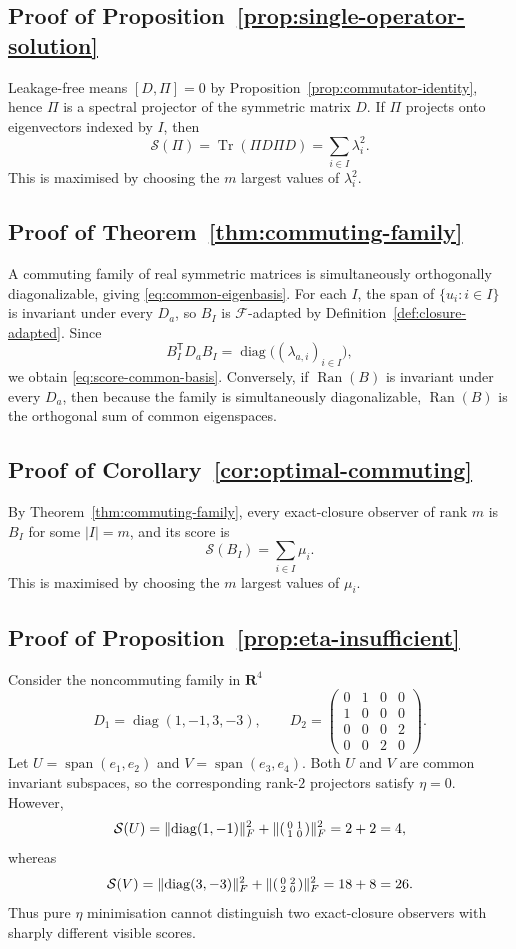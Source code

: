 \documentclass[11pt,a4paper]{article}
\numberwithin{equation}{section}
\DeclareMathOperator{\Tr}{Tr}
\DeclareMathOperator{\Ran}{Ran}
\DeclareMathOperator{\diag}{diag}
\DeclareMathOperator{\spanop}{span}
\DeclarePairedDelimiter{\norm}{\lVert}{\rVert}
\newcommand{\R}{\mathbf R}
\theoremstyle{thmcompact}
\theoremstyle{remark}
\begin{document}
\subsection*{Proof of Proposition~\ref{prop:single-operator-solution}}
Leakage-free means $[D,\Pi]=0$ by Proposition~\ref{prop:commutator-identity}, hence $\Pi$ is a spectral projector of the symmetric matrix $D$. If $\Pi$ projects onto eigenvectors indexed by $I$, then
\[
\mathcal S(\Pi)=\Tr(\Pi D\Pi D)=\sum_{i\in I}\lambda_i^2.
\]
This is maximised by choosing the $m$ largest values of $\lambda_i^2$.

\subsection*{Proof of Theorem~\ref{thm:commuting-family}}
A commuting family of real symmetric matrices is simultaneously orthogonally diagonalizable, giving \eqref{eq:common-eigenbasis}. For each $I$, the span of $\{u_i:i\in I\}$ is invariant under every $D_a$, so $B_I$ is $\mathcal F$-adapted by Definition~\ref{def:closure-adapted}. Since
\[
B_I^{\mathsf T}D_aB_I=\diag\bigl((\lambda_{a,i})_{i\in I}\bigr),
\]
we obtain \eqref{eq:score-common-basis}. Conversely, if $\Ran(B)$ is invariant under every $D_a$, then because the family is simultaneously diagonalizable, $\Ran(B)$ is the orthogonal sum of common eigenspaces.

\subsection*{Proof of Corollary~\ref{cor:optimal-commuting}}
By Theorem~\ref{thm:commuting-family}, every exact-closure observer of rank $m$ is $B_I$ for some $|I|=m$, and its score is
\[
\mathcal S(B_I)=\sum_{i\in I}\mu_i.
\]
This is maximised by choosing the $m$ largest values of $\mu_i$.

\subsection*{Proof of Proposition~\ref{prop:eta-insufficient}}
Consider the noncommuting family in $\R^4$
\[
D_1=\diag(1,-1,3,-3),
\qquad
D_2=
\begin{pmatrix}
0&1&0&0\\
1&0&0&0\\
0&0&0&2\\
0&0&2&0
\end{pmatrix}.
\]
Let $U=\spanop(e_1,e_2)$ and $V=\spanop(e_3,e_4)$. Both $U$ and $V$ are common invariant subspaces, so the corresponding rank-$2$ projectors satisfy $\eta=0$. However,
\[
\mathcal S(U)=\norm{\diag(1,-1)}_F^2+\norm{\begin{psmallmatrix}0&1\\1&0\end{psmallmatrix}}_F^2=2+2=4,
\]
whereas
\[
\mathcal S(V)=\norm{\diag(3,-3)}_F^2+\norm{\begin{psmallmatrix}0&2\\2&0\end{psmallmatrix}}_F^2=18+8=26.
\]
Thus pure $\eta$ minimisation cannot distinguish two exact-closure observers with sharply different visible scores.
\end{document}
